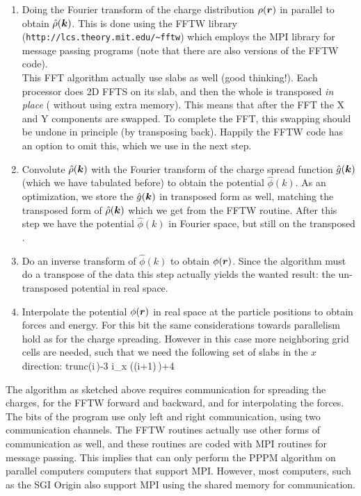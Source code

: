 \begin{enumerate}
\item	Doing the Fourier transform of the charge distribution $\rho(\mbox{\boldmath ${r}$})$ 
	in parallel to obtain $\hat{\rho}(\mbox{\boldmath ${k}$})$. This is done using
	the FFTW library ({\tt http://lcs.theory.mit.edu/\~{ }fftw})
	which employs the MPI library for message passing programs
	(note that there are also  versions
	of the FFTW code).\\
	This FFT algorithm actually use slabs as well (good
	thinking!).  Each processor does 2D FFTS on its slab, and then
	the whole {\fftgrid} is transposed {\em in place}
	({\ie} without using extra memory).  This means that after the
	FFT the X and Y components are swapped.  To complete the FFT,
	this swapping should be undone in principle (by transposing
	back).  Happily the FFTW code has an option to omit this,
	which we use in the next step.
\item	Convolute $\hat{\rho}(\mbox{\boldmath ${k}$})$ with the Fourier transform of the
	charge spread function $\hat{g}(\mbox{\boldmath ${k}$})$ (which we have tabulated before)
	to obtain the potential $\hat{\phi}(k)$. 
	As an optimization, we store the $\hat{g}(\mbox{\boldmath ${k}$})$  in transposed form
	as well, matching the transposed form of $\hat{\rho}(\mbox{\boldmath ${k}$})$
	which we get from the FFTW routine. After this step we have the 
	potential $\hat{\phi}(k)$ in Fourier space, but still on the transposed
	{\fftgrid}.
\item	Do an inverse transform of $\hat{\phi}(k)$ to obtain
	${\phi}(\mbox{\boldmath ${r}$})$. Since the algorithm must do a transpose of the data
	this step actually yields the wanted result: the un-transposed
	potential in real space.
\item	Interpolate the potential ${\phi}(\mbox{\boldmath ${r}$})$ in real space at the particle
	positions to obtain forces and energy. For this bit the same considerations
	towards parallelism hold as for the charge spreading. However in this
	case more neighboring grid cells are needed, such that we need
	the following set of {\fftgrid} slabs in the $x$ direction:
	\beq
	{\rm trunc}\left(i\,\right)-3 \le i_x \left((i+1)\,\right)+4
	\eeq

\end{enumerate}
The algorithm as sketched above requires communication for spreading
the charges, for the FFTW forward and backward, and for interpolating
the forces.  The {\gromacs} bits of the program use only left and
right communication, {\ie}  using two communication channels. The FFTW
routines actually use other forms of communication as well, and these
routines are coded with MPI routines for message passing. This implies
that {\gromacs} can only perform the PPPM algorithm on parallel
computers computers that support MPI. However, most
 computers, such as the SGI Origin also
support MPI using the 
shared memory for communication.

